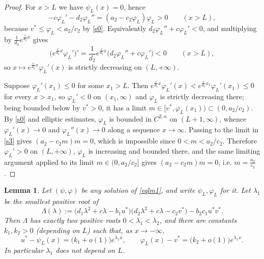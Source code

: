 \documentclass[reqno]{amsart}
\theoremstyle{plain}
\newtheorem{lemma}[theorem]{Lemma}
\theoremstyle{definition}
\theoremstyle{remark}
\begin{document}
\begin{proof}
	For $x>L$ we have $\psi_L(x)=0$, hence
	\begin{equation}\label{s3}
		-c \varphi_L' - d_2 \varphi_L'' = (a_2 - c_2\varphi_L)\varphi_L > 0
		\qquad (x>L),
	\end{equation}
	because $v^*\le\varphi_L<a_2/c_2$ by \eqref{s0}. Equivalently
	$d_2\varphi_L''+c\varphi_L'<0$, and multiplying by
	$\frac{1}{d_2}e^{\frac{c}{d_2}x}$ gives
	\[
	\Big(e^{\frac{c}{d_2}x}\varphi_L'\Big)'
	=\frac{1}{d_2}e^{\frac{c}{d_2}x}\big(d_2\varphi_L''+c\varphi_L'\big)<0
	\qquad (x>L),
	\]
	so $x\mapsto e^{\frac{c}{d_2}x}\varphi_L'(x)$ is strictly decreasing on
	$(L,+\infty)$.

	Suppose $\varphi_L'(x_1)\le0$ for some $x_1>L$. Then
	$e^{\frac{c}{d_2}x}\varphi_L'(x)<e^{\frac{c}{d_2}x_1}\varphi_L'(x_1)\le0$
	for every $x>x_1$, so $\varphi_L'<0$ on $(x_1,\infty)$ and $\varphi_L$ is
	strictly decreasing there; being bounded below by $v^*>0$, it has a limit
	$m\in[v^*,\varphi_L(x_1))\subset(0,a_2/c_2)$. By \eqref{s0} and elliptic
	estimates, $\varphi_L$ is bounded in $C^{2,\alpha}$ on $(L+1,\infty)$, whence
	$\varphi_L'(x)\to0$ and $\varphi_L''(x)\to0$ along a sequence $x\to\infty$.
	Passing to the limit in \eqref{s3} gives $(a_2-c_2m)m=0$, which is impossible
	since $0<m<a_2/c_2$. Therefore $\varphi_L'>0$ on $(L,+\infty)$, $\varphi_L$ is
	increasing and bounded there, and the same limiting argument applied to its
	limit $m\in(0,a_2/c_2]$ gives $(a_2-c_2m)m=0$, i.e. $m=\frac{a_2}{c_2}$.
\end{proof}

\begin{lemma}\label{lm:asym}
	Let $(\psi,\varphi)$ be any solution of \eqref{eqlm1}, and write
	$\psi_L,\varphi_L$ for it. Let $\lambda_1$ be the smallest positive root of
	\begin{equation}\label{charac}
		\Lambda(\lambda):=\big(d_1\lambda^2+c\lambda-b_1u^*\big)\big(d_2\lambda^2+c\lambda-c_2v^*\big)-b_2c_1u^*v^* .
	\end{equation}
	Then $\Lambda$ has exactly two positive roots $0<\lambda_1<\lambda_2$, and
	there are constants $k_1,k_2>0$ (depending on $L$) such that, as
	$x\to-\infty$,
	\begin{equation}\label{asym}
		u^*-\psi_L(x)=\big(k_1+o(1)\big)e^{\lambda_1x},
		\qquad
		\varphi_L(x)-v^*=\big(k_2+o(1)\big)e^{\lambda_1x}.
	\end{equation}
	In particular $\lambda_1$ does not depend on $L$.
\end{lemma}
\end{document}
